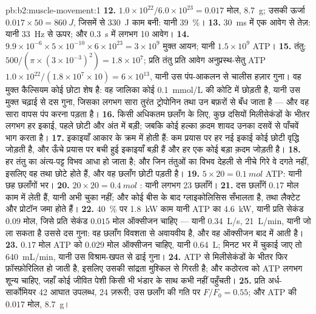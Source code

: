 \begin{solution}{pb:b2:muscle-movement:1}
\textbf{12.} $1.0\times 10^{22}/6.0\times 10^{23} = 0.017$ मोल,
\qty{8.7}{g}; उसकी ऊर्जा $0.017\times 50 = \qty{860}{J}$, जिसमें से
\qty{330}{J} काम बनी: यानी \qty{39}{\%}।
\textbf{13.} \qty{30}{ms} में एक आवेग से तेज़: यानी
\qty{33}{Hz} से ऊपर; और \qty{0.3}{s} में लगभग 10 आवेग।
\textbf{14.} $9.9\times 10^{-6}\times 5\times 10^{-10}\times 6\times
10^{23} = 3\times 10^{9}$ मुक्त आयन; यानी $1.5\times 10^{9}$ ATP।
\textbf{15.} तंतु: $500/(\pi\times(3\times 10^{-3})^{2}) = 1.8\times
10^{7}$; प्रति तंतु प्रति आवेग अनुप्रस्थ-सेतु ATP $1.0\times
10^{22}/(1.8\times 10^{7}\times 10) = 6\times 10^{13}$, यानी उस पंप-आकलन से चालीस हज़ार
गुना। वह मुक्त कैल्सियम कोई छोटा शेष है: वह
जालिका कोई \qty{0.1}{mmol/L} की कोटि में छोड़ती है, यानी उस मुक्त चढ़ाई से दस
गुना, जिसका लगभग सारा तुरंत ट्रोपोनिन तथा उन बफ़रों से बँध जाता है
--- और वह सारा वापस पंप करना पड़ता है।
\textbf{16.} किसी अधिकतम छलाँग के लिए, कुछ दसियों मिलीसेकंडों के भीतर लगभग हर
इकाई, पहले छोटी और अंत में बड़ी; जबकि कोई हल्का
क़दम शायद उनका दसवें से पाँचवें भाग  करता है।
\textbf{17.} इकाइयाँ आकार के क्रम में  होती हैं: कम प्रयास पर हर
नई इकाई कोई छोटी वृद्धि जोड़ती है, और ऊँचे प्रयास पर बची हुई इकाइयाँ
बड़ी हैं और हर एक कोई बड़ा क़दम जोड़ती है।
\textbf{18.} हर तंतु का अंत्य-पट्ट विभव आधा हो जाता है; और जिन
तंतुओं का विभव देहली से नीचे गिरे वे दगते नहीं, इसलिए वह
 तथा  छोटे होते हैं, और वह छलाँग छोटी पड़ती है।
\textbf{19.} $5\times 20 = \qty{0.1}{mol}$ ATP: यानी छह छलाँगों भर।
\textbf{20.} $20\times 20 = \qty{0.4}{mol}$ :
यानी लगभग 23 छलाँगें।
\textbf{21.} दस छलाँगें $0.17$ मोल काम में लेती हैं, यानी  अभी चुका नहीं; और कोई बीस के बाद ग्लाइकोलिसिस सँभालता है, तथा लैक्टेट
और प्रोटॉन जमा होते हैं।
\textbf{22.} \qty{40}{\%} पर \qty{1.8}{kW} काम यानी ATP का
\qty{4.6}{kW}, यानी प्रति सेकंड $0.09$ मोल, जिसे प्रति सेकंड $0.015$ मोल ऑक्सीजन चाहिए ---
यानी \qty{0.34}{L/s}, \qty{21}{L/min}, यानी  जो ला सकता है उससे दस गुना:
वह छलाँग विवशता से अवायवीय है, और वह ऑक्सीजन बाद में आती है।
\textbf{23.} $0.17$ मोल ATP को $0.029$ मोल ऑक्सीजन चाहिए,
यानी \qty{0.64}{L}; मिनट भर में चुकाई जाए तो \qty{640}{mL/min}, यानी उस
विश्राम-खपत से ढाई गुना।
\textbf{24.} ATP  से मिलीसेकंडों के भीतर फिर
फ़ॉस्फ़ोरिलित हो जाती है, इसलिए उसकी सांद्रता मुश्किल से गिरती है; और कठोरत्व को ATP
लगभग शून्य चाहिए, जहाँ कोई जीवित पेशी किसी भी भंडार के साथ कभी नहीं पहुँचती।
\textbf{25.} प्रति अर्ध-सार्कोमियर 42 आघात उपलब्ध, 24 ज़रूरी;
उस छलाँग की गति पर $F/F_0 = 0.55$; और ATP की $0.017$ मोल, \qty{8.7}{g}।
\end{solution}
